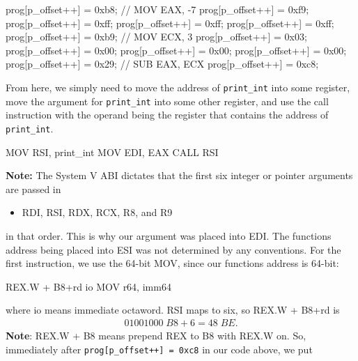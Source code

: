 \documentclass{report}
\begin{document}
\begin{itemize}
\begin{cppcode}
            prog[p_offset++] = 0xb8;  // MOV EAX, -7
            prog[p_offset++] = 0xf9;
            prog[p_offset++] = 0xff;
            prog[p_offset++] = 0xff;
            prog[p_offset++] = 0xff;
            prog[p_offset++] = 0xb9;  // MOV  ECX, 3
            prog[p_offset++] = 0x03;
            prog[p_offset++] = 0x00;
            prog[p_offset++] = 0x00;
            prog[p_offset++] = 0x00;
            prog[p_offset++] = 0x29;  // SUB  EAX, ECX
            prog[p_offset++] = 0xc8;
            \end{cppcode}
            \bigbreak \noindent 
            From here, we simply need to move the address of \texttt{print\_int} into some register, move the argument for \texttt{print\_int} into some other register, and use the call instruction with the operand being the register that contains the address of \texttt{print\_int}.
            \bigbreak \noindent 
            \begin{cppcode}
                MOV  RSI, print_int
                MOV  EDI, EAX
                CALL RSI
            \end{cppcode}
            \bigbreak \noindent 
            \textbf{Note:} The System V ABI dictates that the first six integer or pointer arguments are passed in 
            \begin{itemize}
                \item RDI, RSI, RDX, RCX, R8, and R9 
            \end{itemize}
            in that order. This is why our argument was placed into EDI. The functions address being placed into ESI was not determined by any conventions.
            \bigbreak \noindent 
            For the first instruction, we use the 64-bit MOV, since our functions address is 64-bit:
            \bigbreak \noindent 
            \begin{cppcode}
            REX.W + B8+rd io MOV r64, imm64
            \end{cppcode}
            \bigbreak \noindent 
            where io means immediate octaword. RSI maps to six, so REX.W + B8+rd is
            \begin{align*}
                01001000\; B8+6 = 48\; BE
            .\end{align*}
            \textbf{Note}: REX.W + B8 means prepend REX to B8 with REX.W on. 
            \bigbreak \noindent 
            So, immediately after \texttt{prog[p\_offset++] = 0xc8} in our code above, we put
            \bigbreak \noindent 
            \begin{cppcode}

\end{cppcode}
\end{itemize}
\end{document}
